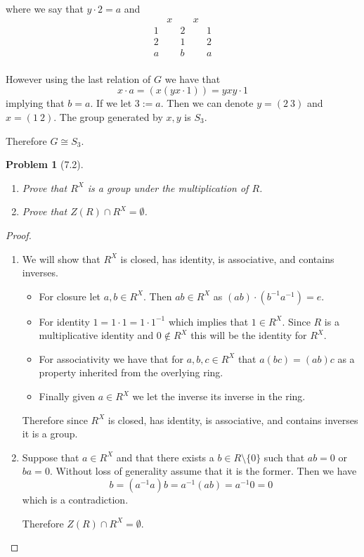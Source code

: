 \documentclass[10pt]{article}
\newcommand{\sk}{\vskip 10mm}
\theoremstyle{plain}
\newtheorem{problem}{Problem}
\theoremstyle{remark}
\begin{document}
where we say that $y\cdot 2=a$ and
\[
  \begin{array}{ccccc}
    &x&&x&\\
    \hline
    1&&2&&1\\
    2&&1&&2\\
    a&&b&&a\\
  \end{array}
\]

However using the last relation of $G$ we have that
\[x\cdot a=(x(yx\cdot 1))=yxy\cdot 1\]
implying that $b=a$. If we let $3:=a$. Then we can
denote $y=(2\ 3)$ and $x=(1\ 2)$. The group generated
by $x,y$ is $S_3$.

Therefore $G\cong S_3$.

\sk

\begin{problem}[7.2]
  \begin{enumerate}
  \item Prove that $R^X$ is a group under the multiplication of $R$.
  \item Prove that $Z(R)\cap R^X=\emptyset$.
  \end{enumerate}
\end{problem}

\begin{proof}
  \begin{enumerate}
  \item We will show that $R^X$ is closed, has identity, is associative, and
    contains inverses.
    \begin{itemize}
    \item For closure let $a,b\in R^X$. Then $ab\in R^X$ as $(ab)\cdot(b^{-1}a^{-1})=e$.
    \item For identity $1=1\cdot 1=1\cdot 1^{-1}$ which implies that $1\in R^X$. Since
      $R$ is a multiplicative identity and $0\notin R^X$ this will be the identity
      for $R^X$.
    \item For associativity we have that for $a,b,c\in R^X$ that $a(bc)=(ab)c$
      as a property inherited from the overlying ring.
    \item Finally given $a\in R^X$ we let the inverse  its inverse in the ring.
    \end{itemize}
    Therefore since $R^X$ is closed, has identity, is associative, and contains
    inverses it is a group.
  \item Suppose that $a\in R^X$ and that there exists a $b\in R\setminus\{0\}$ such that
    $ab=0$ or $ba=0$. Without loss of generality assume that it is the
    former. Then we have
    \[ b=(a^{-1}a)b=a^{-1}(ab)=a^{-1}0=0\]
    which is a contradiction.

    Therefore $Z(R)\cap R^X=\emptyset$.
  \end{enumerate}
\end{proof}
\end{document}
